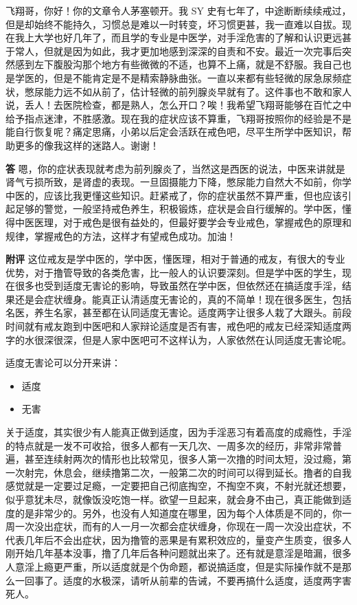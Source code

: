 \begin{case}
    飞翔哥，你好！你的文章令人茅塞顿开。我 SY 史有七年了，中途断断续续戒过，但是却始终不能持久，习惯总是难以一时转变，坏习惯更甚，我一直难以自拔。现在我上大学也好几年了，而且学的专业是中医学，对手淫危害的了解和认识更远甚于常人，但就是因为如此，我才更加地感到深深的自责和不安。最近一次完事后突然感到左下腹股沟那个地方有些微微的不适，也算不上痛，就是不舒服。我自己也是学医的，但是不能肯定是不是精索静脉曲张。一直以来都有些轻微的尿急尿频症状，憋尿能力远不如从前了，估计轻微的前列腺炎早就有了。这件事也不敢和家人说，丢人！去医院检查，都是熟人，怎么开口？唉！我希望飞翔哥能够在百忙之中给予指点迷津，不胜感激。现在我的症状应该不算重，飞翔哥按照你的经验是不是能自行恢复呢？痛定思痛，小弟以后定会活跃在戒色吧，尽平生所学中医知识，帮助更多的像我这样的迷路人。谢谢！

    \textbf{答} 嗯，你的症状表现就考虑为前列腺炎了，当然这是西医的说法，中医来讲就是肾气亏损所致，是肾虚的表现。一旦固摄能力下降，憋尿能力自然大不如前，你学中医的，应该比我更懂这些知识。赶紧戒了，你的症状虽然不算严重，但也应该引起足够的警觉，一般坚持戒色养生，积极锻炼，症状是会自行缓解的。学中医，懂得中医医理，对于戒色是很有益处的，但最好要学会专业戒色，掌握戒色的原理和规律，掌握戒色的方法，这样才有望戒色成功。加油！

    \textbf{附评} 这位戒友是学中医的，学中医，懂医理，相对于普通的戒友，有很大的专业优势，对于撸管导致的各类危害，比一般人的认识要深刻。但是学中医的学生，现在很多也受到适度无害论的影响，导致虽然在学中医，但依然还在搞适度手淫，结果还是会症状缠身。能真正认清适度无害论的，真的不简单！现在很多医生，包括名医，养生名家，甚至都在认同适度无害论。适度两字让很多人栽了大跟头。前段时间就有戒友跑到中医吧和人家辩论适度是否有害，戒色吧的戒友已经深知适度两字的水很深很深，但是人家中医吧可不这样认为，人家依然在认同适度无害论呢。

    适度无害论可以分开来讲：

    \begin{multicols}{2}
        \begin{itemize}
            \item 适度
            \item 无害
        \end{itemize}
    \end{multicols}

    关于适度，其实很少有人能真正做到适度，因为手淫恶习有着高度的成瘾性，手淫的特点就是一发不可收拾，很多人都有一天几次、一周多次的经历，非常非常普遍，甚至连续射两次的情形也比较常见，很多人第一次撸的时间太短，没过瘾，第一次射完，休息会，继续撸第二次，一般第二次的时间可以得到延长。撸者的自我感觉就是一定要过足瘾，一定要把自己彻底掏空，不掏空不爽，不射光就还想要，似乎意犹未尽，就像饭没吃饱一样。欲望一旦起来，就会身不由己，真正能做到适度的是非常少的。另外，也没有人知道度在哪里，因为每个人体质是不同的，你一周一次没出症状，而有的人一月一次都会症状缠身，你现在一周一次没出症状，不代表几年后不会出症状，因为撸管的恶果是有累积效应的，量变产生质变，很多人刚开始几年基本没事，撸了几年后各种问题就出来了。还有就是意淫是暗漏，很多人意淫上瘾更严重，所以适度就是个伪命题，都说搞适度，但是实际操作就不是那么一回事了。适度的水极深，请听从前辈的告诫，不要再搞什么适度，适度两字害死人。


\end{case}
